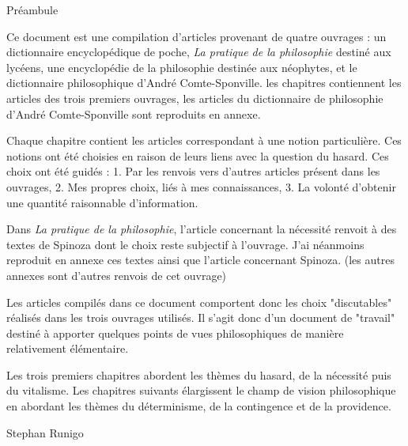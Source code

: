 
\thispagestyle{empty}

\begin{center}
\Large
Préambule
\normalsize
\end{center}
\vspace{3cm}

Ce document est une compilation d'articles provenant de quatre ouvrages : un dictionnaire encyclopédique de poche, {\it La pratique de la philosophie} destiné aux lycéens, une encyclopédie de la philosophie destinée aux néophytes, et le dictionnaire philosophique d'André Comte-Sponville.
les chapitres contiennent les articles des trois premiers ouvrages, les articles du dictionnaire de philosophie d'André Comte-Sponville sont reproduits en annexe.

\vspace{1.3cm}

Chaque chapitre contient les articles correspondant à une notion particulière. Ces notions ont été choisies en raison de leurs liens avec la question du hasard. Ces choix ont été guidés : 1. Par les renvois vers d'autres articles présent dans les ouvrages, 2. Mes propres choix, liés à mes connaissances, 3. La volonté d'obtenir une quantité raisonnable d'information.

\vspace{1.3cm}

Dans {\it La pratique de la philosophie}, l'article concernant la nécessité renvoit à des textes de Spinoza dont le choix reste subjectif à l'ouvrage. J'ai néanmoins reproduit en annexe ces textes ainsi que l'article concernant Spinoza. (les autres annexes sont d'autres renvois de cet ouvrage)

Les articles compilés dans ce document comportent donc les choix "discutables" réalisés dans les trois ouvrages utilisés. Il s'agit donc d'un document de "travail" destiné à apporter quelques points de vues philosophiques de manière relativement élémentaire.

\vspace{1.3cm}

Les trois premiers chapitres abordent les thèmes du hasard, de la nécessité puis du vitalisme. Les chapitres suivants élargissent le champ de vision philosophique en abordant les thèmes du déterminisme, de la contingence et de la providence.

\vspace{2.3cm}

\hfill Stephan Runigo

